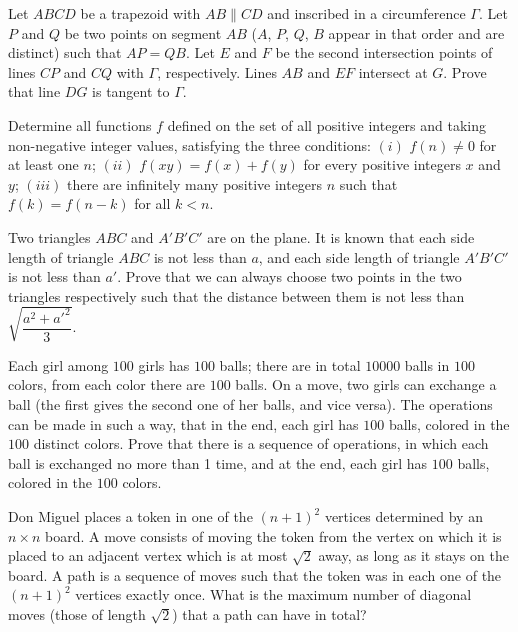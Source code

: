 \documentclass[11pt]{scrartcl}
\begin{document}
\begin{problem}[634298954927697]
Let $ABCD$ be a trapezoid with $AB\parallel CD$ and inscribed in a circumference $\Gamma$. Let $P$ and $Q$ be two points on segment $AB$ ($A$, $P$, $Q$, $B$ appear in that order and are distinct) such that $AP=QB$. Let $E$ and $F$ be the second intersection points of lines $CP$ and $CQ$ with $\Gamma$, respectively. Lines $AB$ and $EF$ intersect at $G$. Prove that line $DG$ is tangent to $\Gamma$.
\end{problem}
\begin{problem}[6116877365036470315]
	Determine all functions $f$ defined on the set of all positive integers and taking non-negative integer values, satisfying the three conditions:
$(i)$ $f(n) \neq 0$ for at least one $n$;
$(ii)$ $f(x y)=f(x)+f(y)$ for every positive integers $x$ and $y$;
$(iii)$ there are infinitely many positive integers $n$ such that $f(k)=f(n-k)$ for all $k<n$.
\end{problem}
\begin{problem}[3838489129977355762]
Two triangles $ABC$ and $A'B'C'$ are on the plane. It is known that each side length of triangle $ABC$ is not less than $a$, and each side length of triangle $A'B'C'$ is not less than $a'$. Prove that we can always choose two points in the two triangles respectively such that the distance between them is not less than $\sqrt{\dfrac{a^2+a'^2}{3}}$.
\end{problem}
\begin{problem}[969197144236847]
	Each girl among $100$ girls has $100$ balls; there are in total $10000$ balls in $100$ colors, from each color there are $100$ balls. On a move, two girls can exchange a ball (the first gives the second one of her balls, and vice versa). The operations can be made in such a way, that in the end, each girl has $100$ balls, colored in the $100$ distinct colors. Prove that there is a sequence of operations, in which each ball is exchanged no more than 1 time, and at the end, each girl has $100$ balls, colored in the $100$ colors.
\end{problem}
\begin{problem}[6751071460392744865]
	Don Miguel places a token in one of the $(n+1)^2$ vertices determined by an $n \times n$ board. A move consists of moving the token from the vertex on which it is placed to an adjacent vertex which is at most $\sqrt2$ away, as long as it stays on the board. A path is a sequence of moves such that the token was in each one of the $(n+1)^2$ vertices exactly once. What is the maximum number of diagonal moves (those of length $\sqrt2$) that a path can have in total?
\end{problem}
\end{document}
